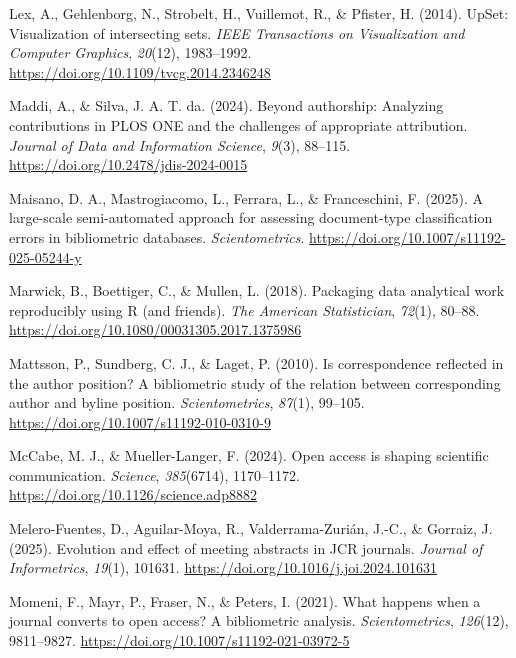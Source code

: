 \documentclass[a4paper,man,floatsintext,longtable,noextraspace,10pt]{apa6}
\newlength{\cslhangindent}
\newenvironment{CSLReferences}[2] %
{\begin{list}{}{%
  \setlength{\itemindent}{0pt}
  \setlength{\leftmargin}{0pt}
  \setlength{\parsep}{0pt}
  \ifodd #1
  \setlength{\leftmargin}{\cslhangindent}
  \setlength{\itemindent}{-1\cslhangindent}
  \fi
  \setlength{\itemsep}{#2\baselineskip}}}
{\end{list}}
\begin{document}
\begin{CSLReferences}{1}{0}
Lex, A., Gehlenborg, N., Strobelt, H., Vuillemot, R., \& Pfister, H.
(2014). UpSet: Visualization of intersecting sets. \emph{IEEE
Transactions on Visualization and Computer Graphics}, \emph{20}(12),
1983--1992. \url{https://doi.org/10.1109/tvcg.2014.2346248}

Maddi, A., \& Silva, J. A. T. da. (2024). Beyond authorship: Analyzing
contributions in PLOS ONE and the challenges of appropriate attribution.
\emph{Journal of Data and Information Science}, \emph{9}(3), 88--115.
\url{https://doi.org/10.2478/jdis-2024-0015}

Maisano, D. A., Mastrogiacomo, L., Ferrara, L., \& Franceschini, F.
(2025). A large-scale semi-automated approach for assessing
document-type classification errors in bibliometric databases.
\emph{Scientometrics}. \url{https://doi.org/10.1007/s11192-025-05244-y}

Marwick, B., Boettiger, C., \& Mullen, L. (2018). Packaging data
analytical work reproducibly using {R} (and friends). \emph{The American
Statistician}, \emph{72}(1), 80--88.
\url{https://doi.org/10.1080/00031305.2017.1375986}

Mattsson, P., Sundberg, C. J., \& Laget, P. (2010). Is correspondence
reflected in the author position? A bibliometric study of the relation
between corresponding author and byline position. \emph{Scientometrics},
\emph{87}(1), 99--105. \url{https://doi.org/10.1007/s11192-010-0310-9}

McCabe, M. J., \& Mueller-Langer, F. (2024). Open access is shaping
scientific communication. \emph{Science}, \emph{385}(6714), 1170--1172.
\url{https://doi.org/10.1126/science.adp8882}

Melero-Fuentes, D., Aguilar-Moya, R., Valderrama-Zurián, J.-C., \&
Gorraiz, J. (2025). Evolution and effect of meeting abstracts in JCR
journals. \emph{Journal of Informetrics}, \emph{19}(1), 101631.
\url{https://doi.org/10.1016/j.joi.2024.101631}

Momeni, F., Mayr, P., Fraser, N., \& Peters, I. (2021). What happens
when a journal converts to open access? A bibliometric analysis.
\emph{Scientometrics}, \emph{126}(12), 9811--9827.
\url{https://doi.org/10.1007/s11192-021-03972-5}


\end{CSLReferences}
\end{document}
